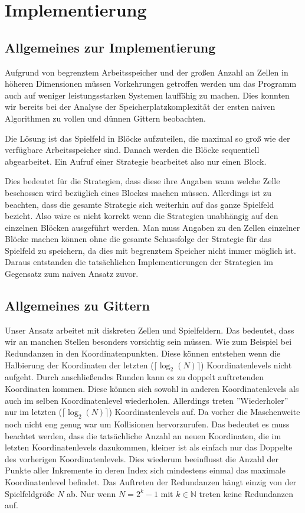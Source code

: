 \documentclass[a4paper,12pt]{llncs}
\numberwithin{equation}{section}
\begin{document}
\section{Implementierung}

\subsection{Allgemeines zur Implementierung}
Aufgrund von begrenztem Arbeitsspeicher und der großen Anzahl an Zellen in höheren Dimensionen müssen Vorkehrungen getroffen werden um das Programm auch auf weniger leistungsstarken Systemen lauffähig zu machen. Dies konnten wir bereits bei der Analyse der Speicherplatzkomplexität der ersten naiven Algorithmen zu vollen und dünnen Gittern beobachten. 

Die Lösung ist das Spielfeld in Blöcke aufzuteilen, die maximal so groß wie der verfügbare Arbeitsspeicher sind. Danach werden die Blöcke sequentiell abgearbeitet. Ein Aufruf einer Strategie bearbeitet also nur einen Block.

Dies bedeutet für die Strategien, dass diese ihre Angaben wann welche Zelle beschossen wird bezüglich eines Blockes machen müssen. Allerdings ist zu beachten, dass die gesamte Strategie sich weiterhin auf das ganze Spielfeld bezieht. Also wäre es nicht korrekt wenn die Strategien unabhängig auf den einzelnen Blöcken ausgeführt werden. Man muss Angaben zu den Zellen einzelner Blöcke machen können ohne die gesamte Schussfolge der Strategie für das Spielfeld zu speichern, da dies mit begrenztem Speicher nicht immer möglich ist. Daraus entstanden die tatsächlichen Implementierungen der Strategien im Gegensatz zum naiven Ansatz zuvor.

\subsection{Allgemeines zu Gittern}

Unser Ansatz arbeitet mit diskreten Zellen und Spielfeldern. Das bedeutet, dass wir an manchen Stellen besonders vorsichtig sein müssen. Wie zum Beispiel bei Redundanzen in den Koordinatenpunkten. Diese können entstehen wenn die Halbierung der Koordinaten der letzten ($\lceil\log_2(N)\rceil$) Koordinatenlevels nicht aufgeht. Durch anschließendes Runden kann es zu doppelt auftretenden Koordinaten kommen. Diese können sich sowohl in anderen Koordinatenlevels als auch im selben Koordinatenlevel wiederholen. Allerdings treten ''Wiederholer'' nur im letzten ($\lceil\log_2(N)\rceil$) Koordinatenlevels auf. Da vorher die Maschenweite noch nicht eng genug war um Kollisionen hervorzurufen. Das bedeutet es muss beachtet werden, dass die tatsächliche Anzahl an neuen Koordinaten, die im letzten Koordinatenlevels dazukommen, kleiner ist als einfach nur das Doppelte des vorherigen Koordinatenlevels. Dies wiederum beeinflusst die Anzahl der Punkte aller Inkremente in deren Index sich mindestens einmal das maximale Koordinatenlevel befindet. Das Auftreten der Redundanzen hängt einzig von der Spielfeldgröße $N$ ab. Nur wenn $N = 2^k-1$ mit $k\in\mathbb{N}$ treten keine Redundanzen auf.
\end{document}
